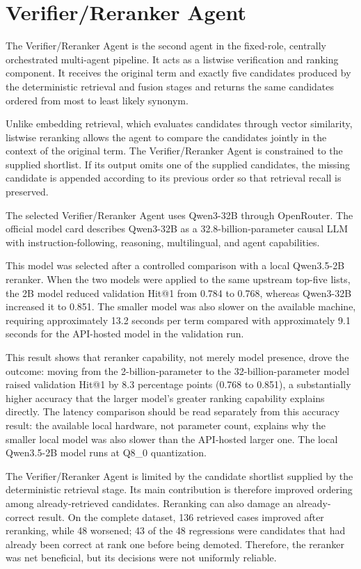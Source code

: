 \section{Verifier/Reranker Agent}

The Verifier/Reranker Agent is the second agent in the fixed-role, centrally orchestrated multi-agent pipeline. It acts as a listwise verification and ranking component. It receives the original term and exactly five candidates produced by the deterministic retrieval and fusion stages and returns the same candidates ordered from most to least likely synonym.

Unlike embedding retrieval, which evaluates candidates through vector similarity, listwise reranking allows the agent to compare the candidates jointly in the context of the original term. The Verifier/Reranker Agent is constrained to the supplied shortlist. If its output omits one of the supplied candidates, the missing candidate is appended according to its previous order so that retrieval recall is preserved.

The selected Verifier/Reranker Agent uses Qwen3-32B through OpenRouter. The official model card describes Qwen3-32B as a 32.8-billion-parameter causal LLM with instruction-following, reasoning, multilingual, and agent capabilities.

This model was selected after a controlled comparison with a local Qwen3.5-2B reranker. When the two models were applied to the same upstream top-five lists, the 2B model reduced validation Hit@1 from 0.784 to 0.768, whereas Qwen3-32B increased it to 0.851. The smaller model was also slower on the available machine, requiring approximately 13.2 seconds per term compared with approximately 9.1 seconds for the API-hosted model in the validation run.

This result shows that reranker capability, not merely model presence, drove the outcome: moving from the 2-billion-parameter to the 32-billion-parameter model raised validation Hit@1 by 8.3 percentage points (0.768 to 0.851), a substantially higher accuracy that the larger model's greater ranking capability explains directly. The latency comparison should be read separately from this accuracy result: the available local hardware, not parameter count, explains why the smaller local model was also slower than the API-hosted larger one. The local Qwen3.5-2B model runs at Q8\_0 quantization.

The Verifier/Reranker Agent is limited by the candidate shortlist supplied by the deterministic retrieval stage. Its main contribution is therefore improved ordering among already-retrieved candidates. Reranking can also damage an already-correct result. On the complete dataset, 136 retrieved cases improved after reranking, while 48 worsened; 43 of the 48 regressions were candidates that had already been correct at rank one before being demoted. Therefore, the reranker was net beneficial, but its decisions were not uniformly reliable.

